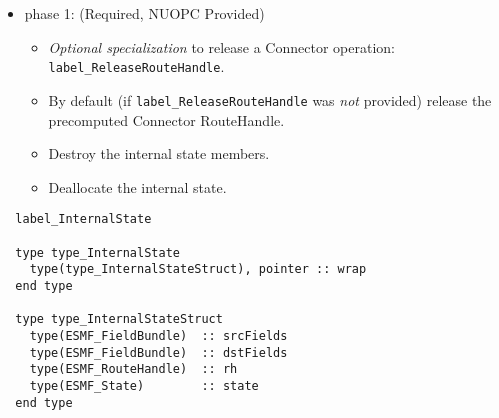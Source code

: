 \begin{itemize}
\item phase 1: ({\sc Required, NUOPC Provided})
  \begin{itemize}
  \item {\it Optional specialization} to release a Connector operation: {\tt label\_ReleaseRouteHandle}.
  \item By default (if {\tt label\_ReleaseRouteHandle} was {\em not} provided) release the precomputed Connector RouteHandle.
  \item Destroy the internal state members.
  \item Deallocate the internal state.
  \end{itemize}      
\end{itemize}

\begin{verbatim}  label_InternalState

  type type_InternalState
    type(type_InternalStateStruct), pointer :: wrap
  end type

  type type_InternalStateStruct
    type(ESMF_FieldBundle)  :: srcFields
    type(ESMF_FieldBundle)  :: dstFields
    type(ESMF_RouteHandle)  :: rh
    type(ESMF_State)        :: state
  end type

\end{verbatim}

